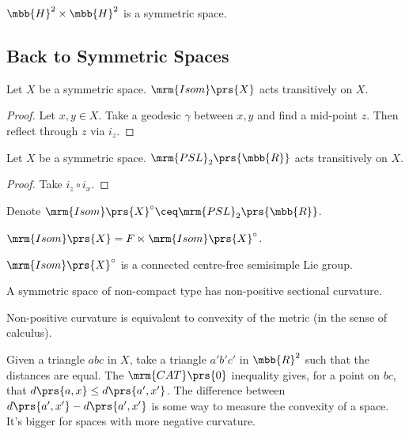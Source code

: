 \documentclass[10pt, twoside]{book}
\begin{document}
\begin{example}
$\mbb{H}^2 \times \mbb{H}^2$ is a symmetric space.
\end{example}

\subsection{Back to Symmetric Spaces}

\begin{proposition}
Let $X$ be a symmetric space. $\mrm{Isom}\prs{X}$ acts transitively on $X$.
\end{proposition}

\begin{proof}
Let $x,y \in X$. Take a geodesic $\gamma$ between $x,y$ and find a mid-point $z$. Then reflect through $z$ via $i_z$.
\end{proof}

\begin{proposition}
Let $X$ be a symmetric space. $\mrm{PSL}_2\prs{\mbb{R}}$ acts transitively on $X$.
\end{proposition}

\begin{proof}
Take $i_z \circ i_x$.
\end{proof}

\begin{notation}
Denote $\mrm{Isom}\prs{X}^\circ \ceq \mrm{PSL}_2\prs{\mbb{R}}$.
\end{notation}

\begin{fact}
$\mrm{Isom}\prs{X} = F \ltimes \mrm{Isom}\prs{X}^\circ$.
\end{fact}

\begin{proposition}
$\mrm{Isom}\prs{X}^\circ$ is a connected centre-free semisimple Lie group.
\end{proposition}

\begin{fact}
A symmetric space of non-compact type has non-positive sectional curvature.
\end{fact}

\begin{proposition}
Non-positive curvature is equivalent to convexity of the metric (in the sense of calculus).
\end{proposition}

Given a triangle $abc$ in $X$, take a triangle $a'b'c'$ in $\mbb{R}^2$ such that the distances are equal.
The $\mrm{CAT}\prs{0}$ inequality gives, for a point on $bc$, that $d\prs{a, x} \leq d\prs{a', x'}$.
The difference between $d\prs{a',x'} - d\prs{a',x'}$ is some way to measure the convexity of a space. It's bigger for spaces with more negative curvature.
\end{document}
